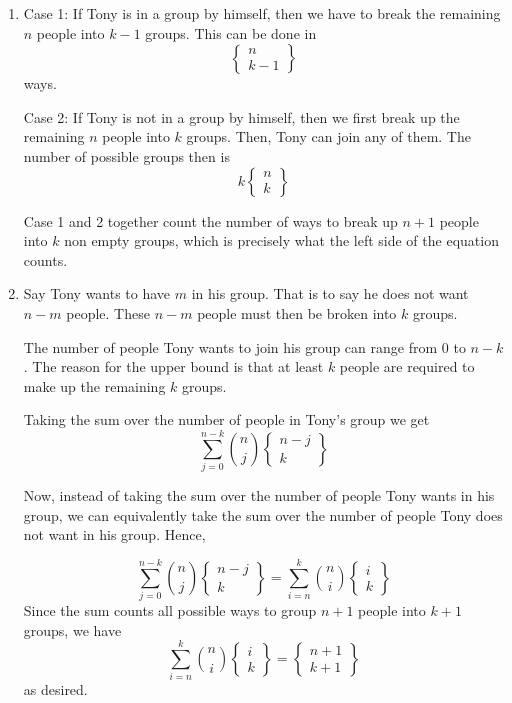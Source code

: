 \begin{enumerate}[label=(\alph*)]
\item Case 1: If Tony is in a group by himself, then we have to break the remaining $n$ people into $k-1$ groups. This can be done in 
  $$
  \left\{
    \begin{array}{cc}
        n\\
        k-1
    \end{array}
  \right\}
  $$
  ways.
  
  Case 2: If Tony is not in a group by himself, then we first break up the remaining $n$ people into $k$ groups. Then, Tony can join any of them. The number of possible groups then is
  $$
  k\left\{
    \begin{array}{cc}
        n\\
        k
    \end{array}
  \right\}
  $$
  
  Case 1 and 2 together count the number of ways to break up $n+1$ people into $k$ non empty groups, which is precisely what the left side of the equation counts.

\item   Say Tony wants to have $m$ in his group. That is to say he does not want $n-m$ people. These $n-m$ people must then be broken into $k$ groups. 
  
  The number of people Tony wants to join his group can range from $0$ to $n-k$. The reason for the upper bound is that at least $k$ people are required to make up the remaining $k$ groups.
  
  Taking the sum over the number of people in Tony's group we get
  $$\sum_{j=0}^{n-k}{n \choose j}\left\{
    \begin{array}{cc}
        n-j\\
        k
    \end{array}
  \right\}
  $$
  
  Now, instead of taking the sum over the number of people Tony wants in his group, we can equivalently take the sum over the number of people Tony does not want in his group. Hence,
  
  $$\sum_{j=0}^{n-k}{n \choose j}\left\{
      \begin{array}{cc}
          n-j\\
          k
      \end{array}
    \right\} = \sum_{i=n}^{k}{n \choose i}\left\{
      \begin{array}{cc}
          i\\
          k
      \end{array}
    \right\}
  $$
Since the sum counts all possible ways to group $n+1$ people into $k+1$ groups, we have 
$$
\sum_{i=n}^{k}{n \choose i}\left\{
      \begin{array}{cc}
          i\\
          k
      \end{array}
    \right\} = 
    \left\{
      \begin{array}{cc}
          n+1\\
          k+1
      \end{array}
    \right\}
$$
as desired.

\end{enumerate}